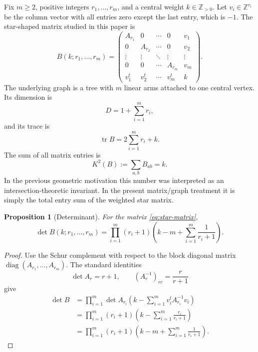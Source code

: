 \documentclass[10pt,a4paper]{amsart}
\newtheorem{proposition}{Proposition}
\newcommand{\ZZ}{\mathbb Z}
\newcommand{\diag}{\operatorname{diag}}
\newcommand{\tr}{\operatorname{tr}}
\begin{document}
Fix $m\geq 2$, positive integers $r_1,\ldots,r_m$, and a central weight $k\in\ZZ_{>0}$.  Let $v_i\in\ZZ^{r_i}$ be the column vector with all entries zero except the last entry, which is $-1$.  The star-shaped matrix studied in this paper is
\begin{equation}
B(k;r_1,\ldots,r_m)=
\begin{pmatrix}
A_{r_1} &0&\cdots&0&v_1\\
0&A_{r_2}&\cdots&0&v_2\\
\vdots&\vdots&\ddots&\vdots&\vdots\\
0&0&\cdots&A_{r_m}&v_m\\
v_1^t&v_2^t&\cdots&v_m^t&k
\end{pmatrix}.
\label{eq:star-matrix}
\end{equation}
The underlying graph is a tree with $m$ linear arms attached to one central vertex.  Its dimension is
\begin{equation}
D=1+\sum_{i=1}^m r_i,
\label{eq:dimension}
\end{equation}
and its trace is
\begin{equation}
\tr B=2\sum_{i=1}^m r_i+k.
\end{equation}
The sum of all matrix entries is
\begin{equation}
K^2(B):=\sum_{a,b}B_{ab}=k.
\label{eq:K-square}
\end{equation}
In the previous geometric motivation this number was interpreted as an intersection-theoretic invariant.  In the present matrix/graph treatment it is simply the total entry sum of the weighted star matrix.

\begin{proposition}[Determinant]
For the matrix \eqref{eq:star-matrix},
\begin{equation}
\det B(k;r_1,\ldots,r_m)=
\prod_{i=1}^m (r_i+1)\left(k-m+\sum_{i=1}^m \frac{1}{r_i+1}\right).
\label{eq:determinant}
\end{equation}
\end{proposition}

\begin{proof}
Use the Schur complement with respect to the block diagonal matrix $\diag(A_{r_1},\ldots,A_{r_m})$.  The standard identities
\[
\det A_r=r+1,\qquad (A_r^{-1})_{rr}=\frac{r}{r+1}
\]
give
\begin{align*}
\det B
&=\prod_{i=1}^m \det A_{r_i}\left(k-\sum_{i=1}^m v_i^t A_{r_i}^{-1}v_i\right)\\
&=\prod_{i=1}^m (r_i+1)\left(k-\sum_{i=1}^m\frac{r_i}{r_i+1}\right)\\
&=\prod_{i=1}^m (r_i+1)\left(k-m+\sum_{i=1}^m\frac{1}{r_i+1}\right).
\end{align*}
\end{proof}
\end{document}
